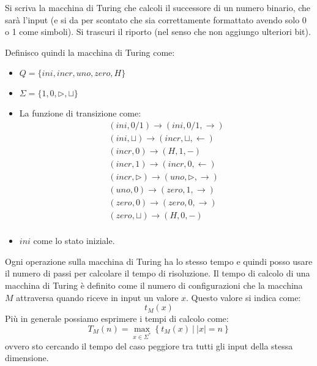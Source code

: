 \begin{esempio} 
    Si scriva la macchina di Turing che calcoli il successore di un numero binario,
    che sarà l'input (e si da per scontato che sia correttamente formattato avendo
    solo 0 o 1 come simboli). Si trascuri il riporto (nel senso che non aggiungo ulteriori bit).

    Definisco quindi la macchina di Turing come:
    \begin{itemize}
        \item $Q = \{ini, incr, uno, zero, H\}$
        \item $\Sigma = \{1, 0, \triangleright, \sqcup\}$
        \item La funzione di transizione come:
              \begin{equation}
                  \begin{aligned}
                      (ini, 0 / 1) \to (ini, 0 / 1, \to)                    \\
                      (ini, \sqcup) \to (incr, \sqcup, \gets)               \\
                      (incr, 0) \to (H, 1, -)                               \\
                      (incr, 1) \to (incr, 0, \gets)                        \\
                      (incr, \triangleright) \to (uno, \triangleright, \to) \\
                      (uno, 0) \to (zero, 1, \to)                           \\
                      (zero, 0) \to (zero, 0, \to)                          \\
                      (zero, \sqcup) \to (H, 0, -)                          \\
                  \end{aligned}
              \end{equation}
        \item $ini$ come lo stato iniziale.
    \end{itemize}
\end{esempio}
Ogni operazione sulla macchina di Turing ha lo stesso tempo e quindi posso usare
il numero di passi per calcolare il tempo di risoluzione. Il tempo di calcolo di
una macchina di Turing è definito come il numero di configurazioni che la macchina
$M$ attraversa quando riceve in input un valore $x$. Questo valore si indica come:
\begin{equation}
    t_M(x)
\end{equation}
Più in generale possiamo esprimere i tempi di calcolo come:
\begin{equation}
    T_M(n) = \max_{x \in \Sigma^{\ast}} \left\{t_M(x) \ | \ |x| = n \right\}
\end{equation}
ovvero sto cercando il tempo del caso peggiore tra tutti gli input della stessa
dimensione.
